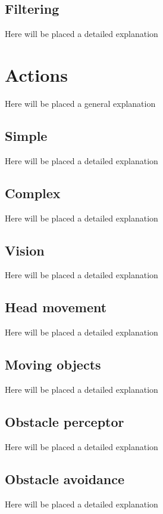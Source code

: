 \subsection{Filtering}
Here will be placed a detailed explanation
\section{Actions}
Here will be placed a general explanation
\subsection{Simple}
Here will be placed a detailed explanation
\subsection{Complex}
Here will be placed a detailed explanation
\subsection{Vision}
Here will be placed a detailed explanation
\subsection{Head movement}
Here will be placed a detailed explanation
\subsection{Moving objects}
Here will be placed a detailed explanation
\subsection{Obstacle perceptor}
Here will be placed a detailed explanation
\subsection{Obstacle avoidance}
Here will be placed a detailed explanation
